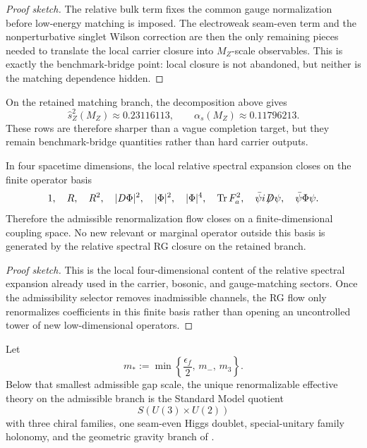 \begin{proof}[Proof sketch]
The relative bulk term fixes the common gauge normalization before low-energy matching is imposed. The electroweak seam-even term and the nonperturbative singlet Wilson correction are then the only remaining pieces needed to translate the local carrier closure into $M_Z$-scale observables. This is exactly the benchmark-bridge point: local closure is not abandoned, but neither is the matching dependence hidden.
\end{proof}

\begin{remark}
On the retained matching branch, the decomposition above gives
\[
\hat s_Z^2(M_Z)\approx \num{0.23116113},
\qquad
\alpha_s(M_Z)\approx \num{0.11796213}.
\]
These rows are therefore sharper than a vague completion target, but they remain benchmark-bridge quantities rather than hard carrier outputs.
\end{remark}

\begin{proposition}
In four spacetime dimensions, the local relative spectral expansion closes on the finite operator basis
\[
1,\quad
R,\quad
R^2,\quad
|D\Phi|^2,\quad
|\Phi|^2,\quad
|\Phi|^4,\quad
\operatorname{Tr} F_a^2,\quad
\bar\psi i\!\not\!\!D\psi,\quad
\bar\psi\Phi\psi.
\]
Therefore the admissible renormalization flow closes on a finite-dimensional coupling space. No new relevant or marginal operator outside this basis is generated by the relative spectral RG closure on the retained branch.
\end{proposition}

\begin{proof}[Proof sketch]
This is the local four-dimensional content of the relative spectral expansion already used in the carrier, bosonic, and gauge-matching sectors. Once the admissibility selector removes inadmissible channels, the RG flow only renormalizes coefficients in this finite basis rather than opening an uncontrolled tower of new low-dimensional operators.
\end{proof}

\begin{corollary}
Let
\[
m_*:=\min\left\{\frac{\epsilon_f}{2},\,m_-,\,m_3\right\}.
\]
Below that smallest admissible gap scale, the unique renormalizable effective theory on the admissible branch is the Standard Model quotient
\[
S(U(3)\times U(2))
\]
with three chiral families, one seam-even Higgs doublet, special-unitary family holonomy, and the geometric gravity branch of .
\end{corollary}

